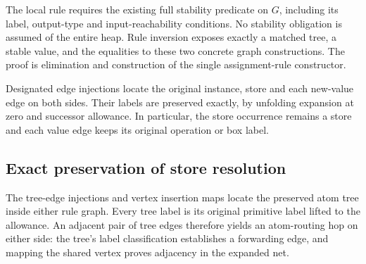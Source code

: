 
The local rule requires the existing full stability predicate on $G$,
including its label, output-type and input-reachability conditions. No
stability obligation is assumed of the entire heap. Rule inversion
exposes exactly a matched tree, a stable value, and the equalities to these
two concrete graph constructions. The proof is elimination and construction
of the single assignment-rule constructor.



Designated edge injections locate the original instance, store and each
new-value edge on both sides. Their labels are preserved exactly, by
unfolding expansion at zero and successor allowance. In particular, the
store occurrence remains a store and each value edge keeps its original
operation or box label.









\subsection{Exact preservation of store resolution}

The tree-edge injections and vertex insertion maps locate the preserved
atom tree inside either rule graph. Every tree label is its original
primitive label lifted to the allowance. An adjacent pair of tree edges
therefore yields an atom-routing hop on either side: the tree's label
classification establishes a forwarding edge, and mapping the shared
vertex proves adjacency in the expanded net.


